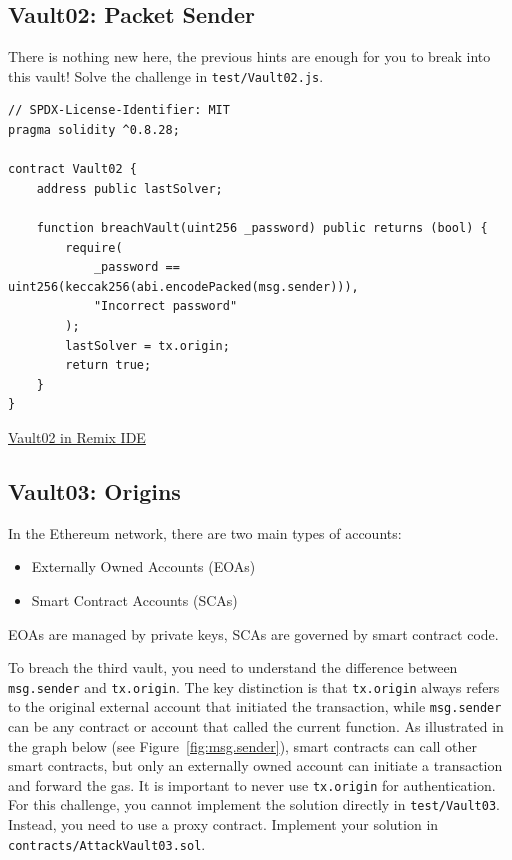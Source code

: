 \documentclass[12pt]{article}
\begin{document}
\subsection*{Vault02: Packet Sender}

There is nothing new here, the previous hints are enough for you to break into this vault! Solve the challenge in \texttt{test/Vault02.js}.

\begin{lstlisting}[language=Solidity]
// SPDX-License-Identifier: MIT
pragma solidity ^0.8.28;
 
contract Vault02 {
    address public lastSolver;
 
    function breachVault(uint256 _password) public returns (bool) {
        require(
            _password == uint256(keccak256(abi.encodePacked(msg.sender))),
            "Incorrect password"
        );
        lastSolver = tx.origin;
        return true;
    }
}
\end{lstlisting}

\medskip
\noindent
\href{https://remix.ethereum.org/?#activate=solidity&url=https://github.com/radovluk/unbreakable-vault/contracts/Vault02.sol&lang=en&optimize=false&runs=200&evmVersion=null&version=soljson-v0.8.28+commit.7893614a.js}{Vault02 in Remix IDE}

\subsection*{Vault03: Origins}

In the Ethereum network, there are two main types of accounts:

\begin{itemize}
  \item Externally Owned Accounts (EOAs)
  \item Smart Contract Accounts (SCAs)
\end{itemize}
EOAs are managed by private keys, SCAs are governed by smart contract code.

\noindent
To breach the third vault, you need to understand the difference between \texttt{msg.sender} and \texttt{tx.origin}. The key distinction is that \texttt{tx.origin} always refers to the original external account that initiated the transaction, while \texttt{msg.sender} can be any contract or account that called the current function. As illustrated in the graph below (see Figure~\ref{fig:msg.sender}), smart contracts can call other smart contracts, but only an externally owned account can initiate a transaction and forward the gas. It is important to never use \texttt{tx.origin} for authentication. For this challenge, you cannot implement the solution directly in \texttt{test/Vault03}. Instead, you need to use a proxy contract. Implement your solution in \texttt{contracts/AttackVault03.sol}.
\end{document}
